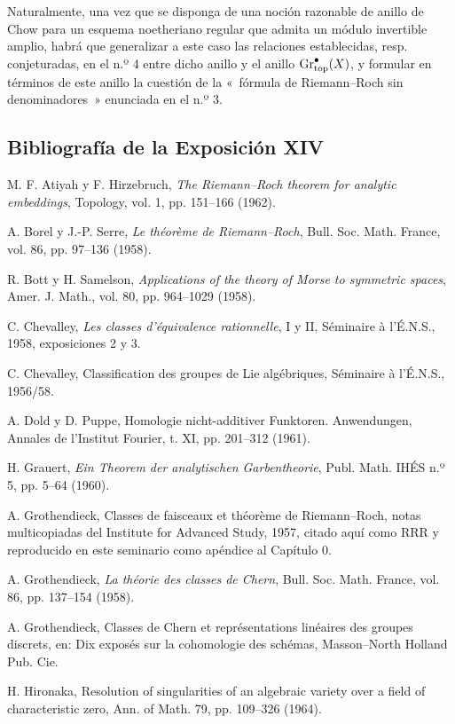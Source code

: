 Naturalmente, una vez que se disponga de una noción razonable de anillo de
Chow para un esquema noetheriano regular que admita un módulo invertible
amplio, habrá que generalizar a este caso las relaciones establecidas, resp.
conjeturadas, en el n.º 4 entre dicho anillo y el anillo
$\operatorname{Gr}_{\mathrm{top}}^\bullet(X)$, y formular en términos de este anillo la cuestión de la
«~fórmula de Riemann--Roch sin denominadores~» enunciada en el n.º 3.

\subsection*{Bibliografía de la Exposición XIV}
\begin{enumerate}[label={[\arabic*]}]
\item M. F. Atiyah y F. Hirzebruch, \emph{The Riemann--Roch theorem for analytic embeddings}, Topology, vol. 1, pp. 151--166 (1962).
\item A. Borel y J.-P. Serre, \emph{Le théorème de Riemann--Roch}, Bull. Soc. Math. France, vol. 86, pp. 97--136 (1958).
\item R. Bott y H. Samelson, \emph{Applications of the theory of Morse to symmetric spaces}, Amer. J. Math., vol. 80, pp. 964--1029 (1958).
\item C. Chevalley, \emph{Les classes d'équivalence rationnelle}, I y II, Séminaire à l'É.N.S., 1958, exposiciones 2 y 3.
\item C. Chevalley, Classification des groupes de Lie algébriques, Séminaire à l'É.N.S., 1956/58.
\item A. Dold y D. Puppe, Homologie nicht-additiver Funktoren. Anwendungen, Annales de l'Institut Fourier, t. XI, pp. 201--312 (1961).
\item H. Grauert, \emph{Ein Theorem der analytischen Garbentheorie}, Publ. Math. IHÉS n.º 5, pp. 5--64 (1960).
\item A. Grothendieck, Classes de faisceaux et théorème de Riemann--Roch, notas multicopiadas del Institute for Advanced Study, 1957, citado aquí como RRR y reproducido en este seminario como apéndice al Capítulo 0.
\item A. Grothendieck, \emph{La théorie des classes de Chern}, Bull. Soc. Math. France, vol. 86, pp. 137--154 (1958).
\item A. Grothendieck, Classes de Chern et représentations linéaires des groupes discrets, en: Dix exposés sur la cohomologie des schémas, Masson--North Holland Pub. Cie.
\item H. Hironaka, Resolution of singularities of an algebraic variety over a field of characteristic zero, Ann. of Math. 79, pp. 109--326 (1964).

\end{enumerate}
